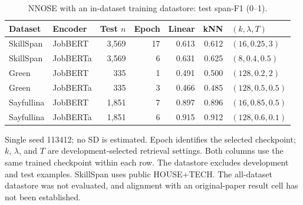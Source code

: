 \begin{table}[htbp]
\centering\small
\caption{NNOSE with an in-dataset training datastore: test span-F1 (0--1).}
\label{tab:external-nnose}
\begin{tabularx}{\linewidth}{@{}L P{.15\linewidth}r r r r P{.19\linewidth}@{}}
\toprule
Dataset & Encoder & Test $n$ & Epoch & Linear & kNN & $(k,\lambda,T)$ \\
\midrule
SkillSpan & JobBERT & 3,569 & 17 & 0.613 & 0.612 & $(16,0.25,3)$ \\
SkillSpan & JobBERTa & 3,569 & 6 & 0.631 & 0.625 & $(8,0.4,0.5)$ \\
Green & JobBERT & 335 & 1 & 0.491 & 0.500 & $(128,0.2,2)$ \\
Green & JobBERTa & 335 & 3 & 0.466 & 0.485 & $(128,0.5,0.5)$ \\
Sayfullina & JobBERT & 1,851 & 7 & 0.897 & 0.896 & $(16,0.85,0.5)$ \\
Sayfullina & JobBERTa & 1,851 & 6 & 0.915 & 0.912 & $(128,0.6,0.1)$ \\
\bottomrule
\end{tabularx}
\par\smallskip\RaggedRight\footnotesize Single seed 113412; no SD is estimated. Epoch identifies the selected checkpoint; $k$, $\lambda$, and $T$ are development-selected retrieval settings. Both columns use the same trained checkpoint within each row. The datastore excludes development and test examples. SkillSpan uses public HOUSE+TECH. The all-dataset datastore was not evaluated, and alignment with an original-paper result cell has not been established.
\end{table}
